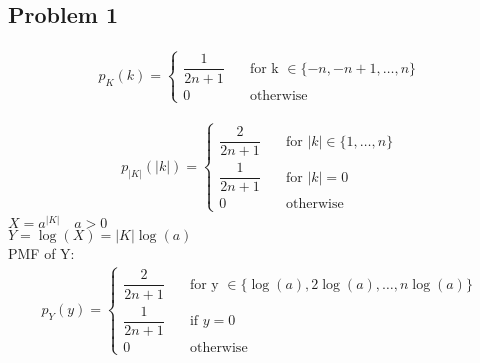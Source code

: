 \documentclass{article}
\begin{document}
\begin{flushleft}
\section*{Problem 1}
\begin{align*}
p_K(k)=\begin{cases}
\dfrac{1}{2n+1} \quad &\text{for k } \in \{-n,-n+1,\dots,n\}\\
0 \quad &\text{otherwise}
\end{cases}
\end{align*}

\begin{align*}
p_{|K|}(|k|)=\begin{cases}
\dfrac{2}{2n+1} \quad &\text{for } |k| \in \{1,\dots,n\}\\
\dfrac{1}{2n+1} \quad &\text{for } |k|=0 \\
0 \quad &\text{otherwise}
\end{cases}
\end{align*}
$X=a^{|K|} \quad a>0$\\
$Y=\log(X)=|K|\log(a)$\\
PMF of Y:
\begin{align*}
p_Y(y)=\begin{cases}
\dfrac{2}{2n+1} \quad &\text{for y } \in  \{\log(a),2\log(a),\dots,n\log(a) \}\\
\dfrac{1}{2n+1} \quad &\text{if } y=0\\
0 \quad &\text{otherwise}
\end{cases}
\end{align*}

\end{flushleft}
\end{document}
